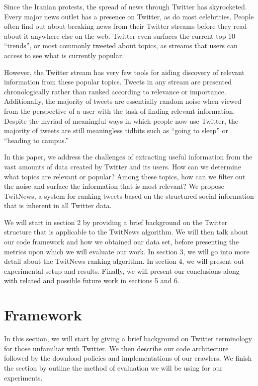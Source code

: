 \documentclass[10pt]{proc}
\begin{document}
Since the Iranian protests, the spread of news through Twitter has skyrocketed. Every major news outlet has a presence on Twitter, as do most celebrities. People often find out about breaking news from their Twitter streams before they read about it anywhere else on the web. Twitter even surfaces the current top 10 ``trends'', or most commonly tweeted about topics, as streams that users can access to see what is currently popular.

However, the Twitter stream has very few tools for aiding discovery of relevant information from these popular topics. Tweets in any stream are presented chronologically rather than ranked according to relevance or importance. Additionally, the majority of tweets are essentially random noise when viewed from the perspective of a user with the task of finding relevant information. Despite the myriad of meaningful ways in which people now use Twitter, the majority of tweets are still meaningless tidbits such as ``going to sleep'' or ``heading to campus.''

In this paper, we address the challenges of extracting useful information from the vast amounts of data created by Twitter and its users. How can we determine what topics are relevant or popular? Among these topics, how can we filter out the noise and surface the information that is most relevant? We propose TwitNews, a system for ranking tweets based on the structured social information that is inherent in all Twitter data.

We will start in section 2 by providing a brief background on the Twitter structure that is applicable to the TwitNews algorithm. We will then talk about our code framework and how we obtained our data set, before presenting the metrics upon which we will evaluate our work. In section 3, we will go into more detail about the TwitNews ranking algorithm. In section 4, we will present out experimental setup and results. Finally, we will present our conclusions along with related and possible future work in sections 5 and 6.

\section{Framework}

  In this section, we will start by giving a brief background on Twitter terminology for those unfamiliar with Twitter. We then describe our code architecture followed by the download policies and implementations of our crawlers. We finish the section by outline the method of evaluation we will be using for our experiments.
  
\end{document}
